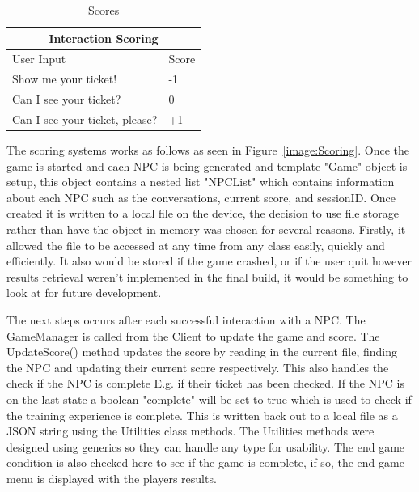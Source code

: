 \begin{table}[!ht]
    \centering
\begin{tabular}{ |p{6cm}|p{2cm}|  }
\hline
\multicolumn{2}{|c|}{Interaction Scoring} \\
\hline
User Input & Score \\
\hline
Show me your ticket! & -1 \\
\hline
Can I see your ticket? & 0 \\
\hline
Can I see your ticket, please? & +1 \\
\hline

\end{tabular}
    \caption{Scores}
    \label{tab:scores}
\end{table}

\newpage

The scoring systems works as follows as seen in Figure~\ref{image:Scoring}. Once the game is started and each NPC is being generated and template "Game" object is setup, this object contains a nested list "NPCList" which contains information about each NPC such as the conversations, current score, and sessionID. Once created it is written to a local file on the device, the decision to use file storage rather than have the object in memory was chosen for several reasons. Firstly, it allowed the file to be accessed at any time from any class easily, quickly and efficiently. It also would be stored if the game crashed, or if the user quit however results retrieval weren't implemented in the final build, it would be something to look at for future development.

\par
\medskip

The next steps occurs after each successful interaction with a NPC. The GameManager is called from the Client to update the game and score. The UpdateScore() method updates the score by reading in the current file, finding the NPC and updating their current score respectively. This also handles the check if the NPC is complete E.g. if their ticket has been checked. If the NPC is on the last state a boolean "complete" will be set to true which is used to check if the training experience is complete. This is written back out to a local file as a JSON string using the Utilities class methods. The Utilities methods were designed using generics so they can handle any type for usability. The end game condition is also checked here to see if the game is complete, if so, the end game menu is displayed with the players results.


